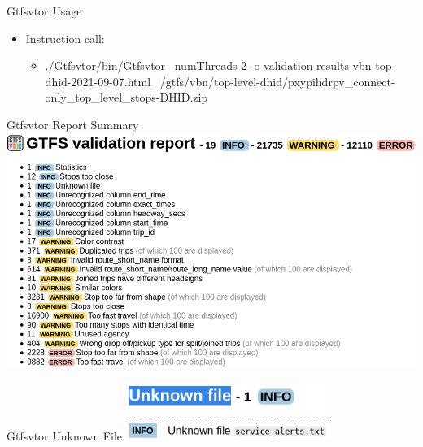 
\begin{frame}{Gtfsvtor Usage}
  \begin{itemize}
  \item Instruction call:
    \begin{itemize}
    \item ./Gtfsvtor/bin/Gtfsvtor --numThreads 2 -o validation-results-vbn-top-dhid-2021-09-07.html ~/gtfs/vbn/top-level-dhid/pxypihdrpv\_connect-only\_top\_level\_stops-DHID.zip
    \end{itemize}
  \end{itemize}
\end{frame}

\begin{frame}{Gtfsvtor Report Summary}
\includegraphics[width=0.95\paperwidth]{gtfs-validation/gtfsvtor-report-vbn-top-dhid.png}
\end{frame}

\begin{frame}{Gtfsvtor Unknown File}
\includegraphics[width=0.5\textwidth]{gtfs-validation/gtfsvtor-report-vbn-top-dhid-unknown-file.png}
\end{frame}

